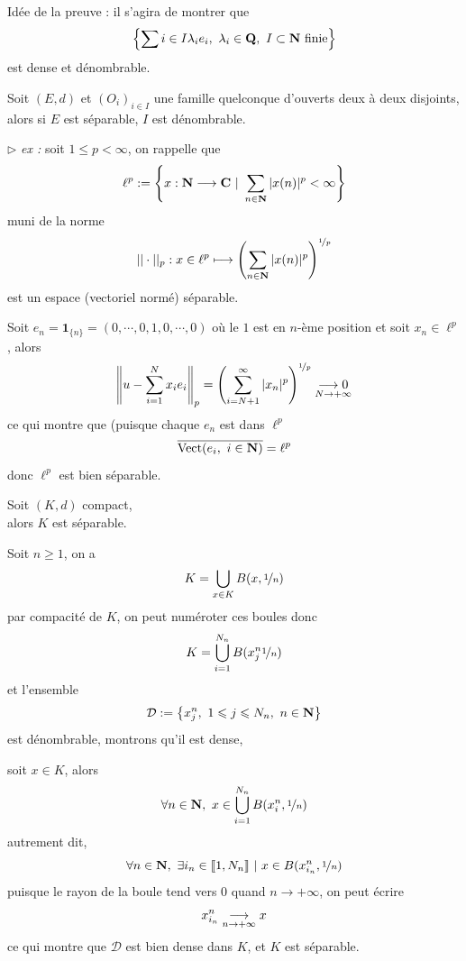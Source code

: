 \documentclass[a4paper,11pt, twoside]{article}
\begin{document}
\begin{Proof}
  Idée de la preuve : il s'agira de montrer que 
  $$\left\{\sum{i\in I}\lambda_i e_i,\ \lambda_i\in\mathbf Q,\ I\subset\N\text{ finie}\right\}$$
  est dense et dénombrable.
\end{Proof}


\begin{prop}
  Soit $(E,d)$ et $(O_i)_{i\in I}$ une famille quelconque d'ouverts deux à deux disjoints,\\

  alors si $E$ est séparable, $I$ est dénombrable.
\end{prop}


$\triangleright$\emph{ ex : }soit $1\leqslant p<\infty$, on rappelle que 
$$\ell^p:=\left\{x:\N\longrightarrow\C\ |\ \sum_{n\in\N}|x(n)|^p<\infty\right\}$$
muni de la norme
$$||\cdot||_p:x\in\ell^p\longmapsto\left(\sum_{n\in\mathbf N}|x(n)|^p\right)^{\nicefrac{1}{p}}$$
est un espace (vectoriel normé) séparable.


\begin{Proof}
  Soit $e_n=\mathbf 1_{\{n\}}=(0,\cdots,0,1,0,\cdots,0)$ où le $1$ est en $n$-ème position et soit $x_n\in\ell^p$, alors 
  $$\left\lVert u-\sum_{i=1}^Nx_ie_i\right\rVert_p=\left(\sum_{i=N+1}^{\infty}|x_n|^p\right)^{\nicefrac{1}{p}}\underset{N\to+\infty}{\longrightarrow 0}$$
  ce qui montre que (puisque chaque $e_n$ est dans $\ell^p$
  $$\overline{\mathrm{Vect}(e_i,\ i\in \mathbf N)}=\ell^p$$
  donc $\ell^p$ est bien séparable.
\end{Proof}


\begin{lemme}
  Soit $(K,d)$ compact,\\

  alors $K$ est séparable.
\end{lemme}

\begin{Proof}
  Soit $n\geqslant 1$, on a 
  $$K=\bigcup_{x\in K}B(x,\nicefrac{1}{n})$$
  par compacité de $K$, on peut numéroter ces boules donc 
  $$K=\bigcup_{i=1}^{N_n}B(x_j^n\nicefrac{1}{n})$$
  et l'ensemble 
  $$\mathcal D:=\left\{x_j^n,\ 1\leqslant j\leqslant N_n,\ n\in\N\right\}$$
  est dénombrable, montrons qu'il est dense,

  soit $x\in K$, alors 
  $$\forall n\in\N,\ x\in\bigcup_{i=1}^{N_n}B(x_i^n, \nicefrac{1}{n})$$
  autrement dit, 
  $$\forall n\in\mathbf N,\ \exists i_n\in\llbracket 1,N_n\rrbracket\ |\ x\in B(x_{i_n}^n,\nicefrac{1}{n})$$
  puisque le rayon de la boule tend vers $0$ quand $n\to+\infty$, on peut écrire 
  $$x_{i_n}^n\underset{n\to+\infty}{\longrightarrow} x$$
  ce qui montre que $\mathcal D$ est bien dense dans $K$, et $K$ est séparable.
\end{Proof}
\end{document}

